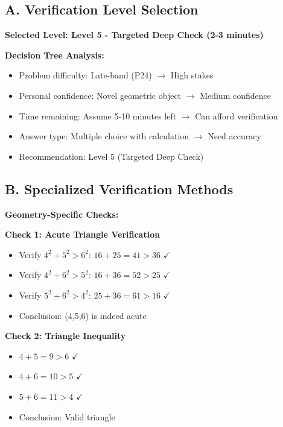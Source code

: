 \documentclass[12pt]{article}
\begin{document}
\begin{verificationbox}

\subsection*{A. Verification Level Selection}

\textbf{Selected Level: Level 5 - Targeted Deep Check (2-3 minutes)}

\textbf{Decision Tree Analysis:}
\begin{itemize}
    \item Problem difficulty: Late-band (P24) $\to$ High stakes
    \item Personal confidence: Novel geometric object $\to$ Medium confidence
    \item Time remaining: Assume 5-10 minutes left $\to$ Can afford verification
    \item Answer type: Multiple choice with calculation $\to$ Need accuracy
    \item Recommendation: Level 5 (Targeted Deep Check)
\end{itemize}

\subsection*{B. Specialized Verification Methods}

\textbf{Geometry-Specific Checks:}

\textbf{Check 1: Acute Triangle Verification}
\begin{itemize}
    \item Verify $4^2 + 5^2 > 6^2$: $16 + 25 = 41 > 36$ $\checkmark$
    \item Verify $4^2 + 6^2 > 5^2$: $16 + 36 = 52 > 25$ $\checkmark$
    \item Verify $5^2 + 6^2 > 4^2$: $25 + 36 = 61 > 16$ $\checkmark$
    \item Conclusion: (4,5,6) is indeed acute
\end{itemize}

\textbf{Check 2: Triangle Inequality}
\begin{itemize}
    \item $4 + 5 = 9 > 6$ $\checkmark$
    \item $4 + 6 = 10 > 5$ $\checkmark$
    \item $5 + 6 = 11 > 4$ $\checkmark$
    \item Conclusion: Valid triangle
\end{itemize}


\end{verificationbox}
\end{document}
